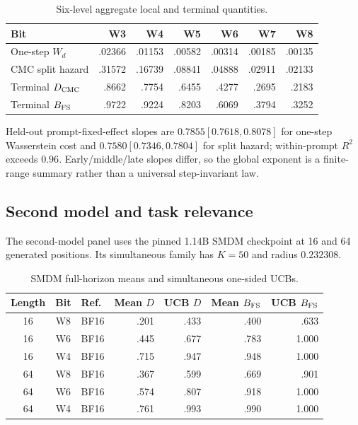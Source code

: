 \begin{table}[ht]
\caption{Six-level aggregate local and terminal quantities.}
\label{tab:app-scaling}
\centering\small
\begin{tabular}{@{}lrrrrrr@{}}
\toprule
Bit & W3 & W4 & W5 & W6 & W7 & W8\\
\midrule
One-step $W_d$ & .02366 & .01153 & .00582 & .00314 & .00185 & .00135\\
CMC split hazard & .31572 & .16739 & .08841 & .04888 & .02911 & .02133\\
Terminal $D_{\rm CMC}$ & .8662 & .7754 & .6455 & .4277 & .2695 & .2183\\
Terminal $B_{\rm FS}$ & .9722 & .9224 & .8203 & .6069 & .3794 & .3252\\
\bottomrule
\end{tabular}
\end{table}

Held-out prompt-fixed-effect slopes are $0.7855[0.7618,0.8078]$ for one-step Wasserstein cost and $0.7580[0.7346,0.7804]$ for split hazard; within-prompt $R^2$ exceeds $0.96$. Early/middle/late slopes differ, so the global exponent is a finite-range summary rather than a universal step-invariant law.

\subsection{Second model and task relevance}
The second-model panel uses the pinned 1.14B SMDM checkpoint at 16 and 64 generated positions. Its simultaneous family has $K=50$ and radius $0.232308$.

\begin{table}[ht]
\caption{SMDM full-horizon means and simultaneous one-sided UCBs.}
\label{tab:app-smdm}
\centering\small
\begin{tabular}{@{}cclrrrr@{}}
\toprule
Length & Bit & Ref. & Mean $D$ & UCB $D$ & Mean $B_{\rm FS}$ & UCB $B_{\rm FS}$\\
\midrule
16 & W8 & BF16 & .201 & .433 & .400 & .633\\
16 & W6 & BF16 & .445 & .677 & .783 & 1.000\\
16 & W4 & BF16 & .715 & .947 & .948 & 1.000\\
64 & W8 & BF16 & .367 & .599 & .669 & .901\\
64 & W6 & BF16 & .574 & .807 & .918 & 1.000\\
64 & W4 & BF16 & .761 & .993 & .990 & 1.000\\
\bottomrule
\end{tabular}
\end{table}


